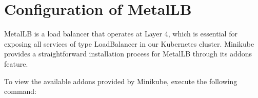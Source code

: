 









\section{Configuration of MetalLB}
MetalLB is a load balancer that operates at Layer 4, which is essential for exposing all services of type LoadBalancer in our Kubernetes cluster. Minikube provides a straightforward installation process for MetalLB through its addons feature.

To view the available addons provided by Minikube, execute the following command:

